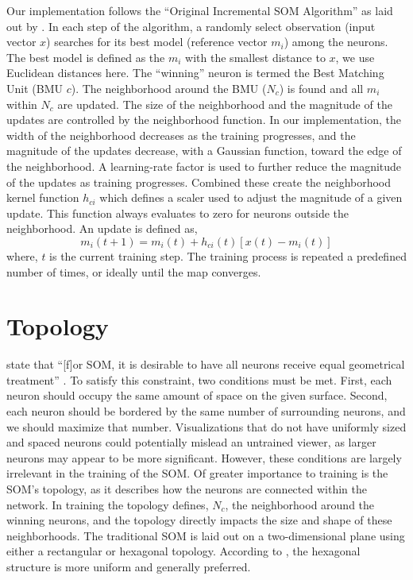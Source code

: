 Our implementation follows the ``Original Incremental SOM Algorithm'' as laid
out by \cite[pp. 109-115]{Kohonen2000}.  In each step of the algorithm, a
randomly select observation (input vector $x$) searches for its best model
(reference vector $m_i$) among the neurons.  The best model is defined as the
$m_i$ with the smallest distance to $x$, we use Euclidean distances here.  The
``winning'' neuron is termed the Best Matching Unit (BMU $c$).  The
neighborhood around the BMU ($N_c$) is found and all $m_i$ within $N_c$ are
updated.  The size of the neighborhood and the magnitude of the updates are
controlled by the neighborhood function. In our implementation, the width of
the neighborhood decreases as the training progresses, and the magnitude of
the updates decrease, with a Gaussian function, toward the edge of the
neighborhood. A learning-rate factor is used to further reduce the magnitude
of the updates as training progresses.  Combined these create the neighborhood
kernel function $h_{ci}$ which defines a scaler used to adjust the magnitude
of a given update.  This function always evaluates to zero for neurons outside
the neighborhood.  An update is defined as,
\begin{equation}
  {m_i(t+1)} = m_i(t) +  h_{ci}(t)[x(t) - m_i(t)]
\label{update}
\end{equation}
where, $t$ is the current training step.  The training process is repeated a
predefined number of times, or ideally until the map converges.

\section{Topology}
\citeauthor{wu2006} state that ``[f]or SOM, it is desirable to have all
neurons receive equal geometrical treatment'' \cite[p. 900]{wu2006}.  To
satisfy this constraint, two conditions must be met.  First, each neuron
should occupy the same amount of space on the given surface.  Second, each
neuron should be bordered by the same number of surrounding neurons, and we
should maximize that number.  Visualizations that do not have uniformly sized
and spaced neurons could potentially mislead an untrained viewer, as larger
neurons may appear to be more significant. However, these conditions are
largely irrelevant in the training of the SOM.  Of greater importance to
training is the SOM's topology, as it describes how the neurons are connected
within the network.  In training the topology defines, $N_c$, the neighborhood
around the winning neurons, and the topology directly impacts the size and
shape of these neighborhoods.  The traditional SOM is laid out on a
two-dimensional plane using either a rectangular or hexagonal topology.
According to \cite{wu2006}, the hexagonal structure is more uniform and
generally preferred.

